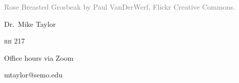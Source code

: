 \documentclass[t]{beamer}
\begin{document}


{
\begin{frame}[b,plain]
	\tiny\textcolor{gray}{Rose Breasted Grosbeak by Paul VanDerWerf, Flickr Creative Commons.}
\end{frame}
}

{
\begin{frame}[t]
	\large
	\vspace{2ex}
	\hangpara\hspace{15em} Dr.~Mike Taylor

	\hangpara\hspace{15em} \textsc{rh} 217
	
	\hangpara \hspace{15em} Office hours via Zoom


	\hangpara\hspace{15em} mtaylor@semo.edu
	

\end{frame}
}


%
%
%
%
%
\end{document}
